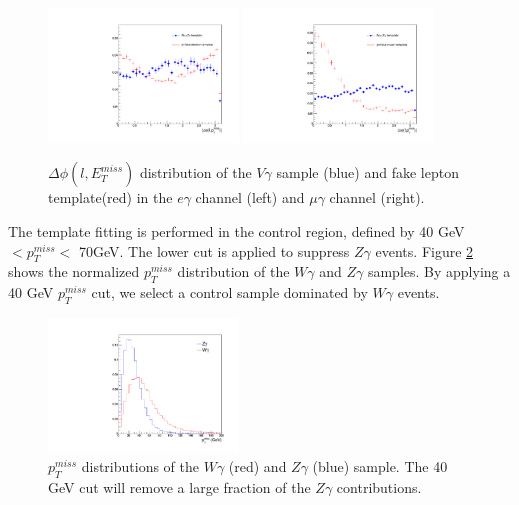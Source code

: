 \documentclass[thesis.tex]{subfiles}
\renewcommand\_{\textunderscore\allowbreak}
\begin{document}
\begin{figure}
  \centering
    \includegraphics[width=0.45\textwidth]{Figures/dphiTemplate_eg.pdf}
    \includegraphics[width=0.45\textwidth]{Figures/dphiTemplate_mg.pdf}
  \caption{$\Delta\phi(l,E_{T}^{miss})$ distribution of the $V\gamma$ sample (blue) and fake lepton template(red) in the $e\gamma$ channel (left) and $\mu\gamma$ channel (right). }
    \label{fig:dphitemplate}
\end{figure}

The template fitting is performed in the control region, defined by 40 GeV $< p_{T}^{miss} <$ 70GeV. The lower cut is applied to suppress $Z\gamma$ events. Figure \ref{fig:WGZG_met} shows the normalized $p_{T}^{miss}$ distribution of the $W\gamma$ and $Z\gamma$ samples. By applying a 40 GeV $p_{T}^{miss}$ cut, we select a control sample dominated by $W\gamma$ events.  

\begin{figure}
  \centering
    \includegraphics[width=0.45\textwidth]{Figures/dphiTemplate_MET.pdf}
  \caption{$p_T^{miss}$ distributions of the $W\gamma$ (red) and $Z\gamma$ (blue) sample. The 40 GeV cut will remove a large fraction of the $Z\gamma$ contributions.}
    \label{fig:WGZG_met}
\end{figure}
\end{document}
